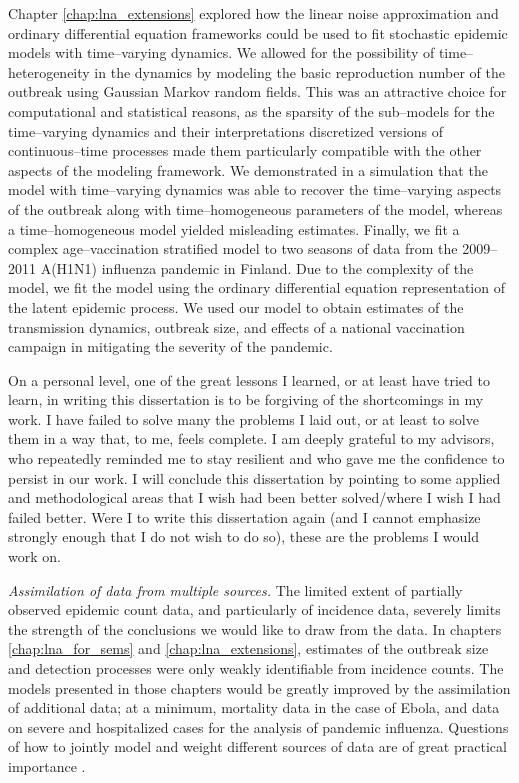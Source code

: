 Chapter \ref{chap:lna_extensions} explored how the linear noise approximation and ordinary differential equation frameworks could be used to fit stochastic epidemic models with time--varying dynamics. We allowed for the possibility of time--heterogeneity in the dynamics by modeling the basic reproduction number of the outbreak using Gaussian Markov random fields. This was an attractive choice for computational and statistical reasons, as the sparsity of the sub--models for the time--varying dynamics and their interpretations discretized versions of continuous--time processes made them particularly compatible with the other aspects of the modeling framework. We demonstrated in a simulation that the model with time--varying dynamics was able to recover the time--varying aspects of the outbreak along with time--homogeneous parameters of the model, whereas a time--homogeneous model yielded misleading estimates. Finally, we fit a complex age--vaccination stratified model to two seasons of data from the 2009--2011 A(H1N1) influenza pandemic in Finland. Due to the complexity of the model, we fit the model using the ordinary differential equation representation of the latent epidemic process. We used our model to obtain estimates of the transmission dynamics, outbreak size, and effects of a national vaccination campaign in mitigating the severity of the pandemic. 

On a personal level, one of the great lessons I learned, or at least have tried to learn, in writing this dissertation is to be forgiving of the shortcomings in my work. I have failed to solve many the problems I laid out, or at least to solve them in a way that, to me, feels complete. I am deeply grateful to my advisors, who repeatedly reminded me to stay resilient and who gave me the confidence to persist in our work. I will conclude this dissertation by pointing to some applied and methodological areas that I wish had been better solved/where I wish I had failed better. Were I to write this dissertation again (and I cannot emphasize strongly enough that I do not wish to do so), these are the problems I would work on. 

\textit{Assimilation of data from multiple sources.}
The limited extent of partially observed epidemic count data, and particularly of incidence data, severely limits the strength of the conclusions we would like to draw from the data. In chapters \ref{chap:lna_for_sems} and \ref{chap:lna_extensions}, estimates of the outbreak size and detection processes were only weakly identifiable from incidence counts. The models presented in those chapters would be greatly improved by the assimilation of additional data; at a minimum, mortality data in the case of Ebola, and data on severe and hospitalized cases for the analysis of pandemic influenza. Questions of how to jointly model and weight different sources of data are of great practical importance \cite{deangelis2015four}. 

